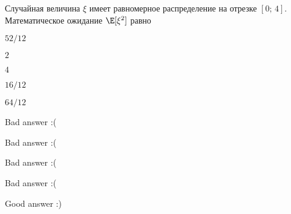 
\begin{question}
Случайная величина \(\xi\) имеет равномерное распределение на отрезке
\([0;\,4]\). Математическое ожидание \(\E[\xi^2]\) равно
\begin{answerlist}
  \item \(52/12\)
  \item \(2\)
  \item \(4\)
  \item \(16/12\)
  \item \(64/12\)
\end{answerlist}
\end{question}

\begin{solution}
\begin{answerlist}
  \item Bad answer :(
  \item Bad answer :(
  \item Bad answer :(
  \item Bad answer :(
  \item Good answer :)
\end{answerlist}
\end{solution}

